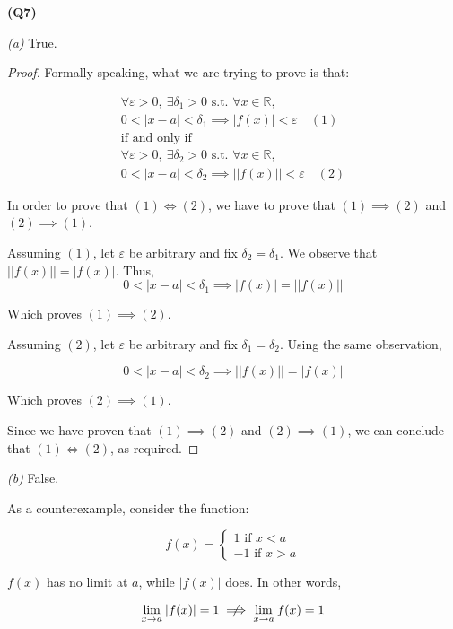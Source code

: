 \documentclass[12pt, a4paper]{article}
\renewcommand{\epsilon}{\varepsilon}
\newcommand{\R}{\mathbb{R}}
\newcommand{\displim}[1]{\displaystyle{\lim_{#1}\:}}
\newcommand{\st}{\text{ s.t. }}
\begin{document}
\textbf{(Q7)}

\textit{(a)}
True.

\begin{proof}
    Formally speaking, what we are trying to prove is that:

    \begin{gather*}
        \forall \epsilon > 0,\: \exists \delta_1 > 0 \st \forall x \in \R,\\
        0 < |x - a| < \delta_1 \implies |f(x)| < \epsilon \quad (1)\\
        \text{if and only if}\\
        \forall \epsilon > 0,\: \exists \delta_2 > 0 \st \forall x \in \R,\\
        0 < |x - a| < \delta_2 \implies \left||f(x)|\right| < \epsilon \quad (2)
    \end{gather*}

    In order to prove that $(1) \iff (2)$, we have to prove that $(1) \implies (2)$
    and $(2) \implies (1)$.

    Assuming $(1)$, let $\epsilon$ be arbitrary and fix $\delta_2 = \delta_1$.
    We observe that $\left||f(x)|\right| = |f(x)|$. Thus,
    \[
        0 < |x - a| < \delta_1 \implies |f(x)| = \left||f(x)|\right|
    \]

    Which proves $(1) \implies (2)$.

    Assuming $(2)$, let $\epsilon$ be arbitrary and fix $\delta_1 = \delta_2$.
    Using the same observation,

    \[
        0 < |x - a| < \delta_2 \implies \left||f(x)|\right| = |f(x)|
    \]

    Which proves $(2) \implies (1)$.

    Since we have proven that $(1) \implies (2)$ and $(2) \implies (1)$, we can
    conclude that $(1) \iff (2)$, as required.

\end{proof}

\textit{(b)}
False.

As a counterexample, consider the function:

\[
    f(x) = \begin{cases}
        1 \text{ if $x < a$}\\
        -1 \text{ if $x > a$}
    \end{cases}
\]

$f(x)$ has no limit at $a$, while $|f(x)|$ does. In other words,

\[
    \displim{x \to a} |f(x)| = 1 \centernot\implies \displim{x \to a} f(x) = 1
\]
\end{document}
